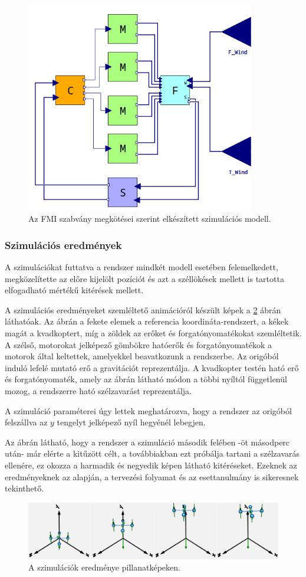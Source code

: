         \begin{figure}[!ht]
            \centering
            \includegraphics[width=100mm, keepaspectratio]{figures/fmiSzim.png}
            \caption{Az FMI szabvány megkötései szerint elkészített szimulációs modell.} 
            \label{fig:fmiSzim}
        \end{figure}

        \subsubsection{Szimulációs eredmények}
        A szimulációkat futtatva a rendszer mindkét modell esetében felemelkedett, megközelítette az előre kijelölt pozíciót és azt a széllökések mellett is tartotta elfogadható mértékű kitérések mellett.
        
        A szimulációs eredményeket szemléltető animációról készült képek a \ref{fig:SimRes} ábrán láthatóak.
        Az ábrán a fekete elemek a referencia koordináta-rendszert, a kékek magát a kvadkoptert, míg a zöldek az erőket és forgatónyomatékokat szemléltetik.
        A szélső, motorokat jelképező gömbökre hatóerők és forgatónyomatékok a motorok által keltettek, amelyekkel beavatkozunk a rendszerbe. Az origóból induló lefelé mutató erő a gravitációt reprezentálja.
        A kvadkopter testén ható erő és forgatónyomaték, amely az ábrán látható módon a többi nyíltól függetlenül mozog, a rendszerre ható szélzavarást reprezentálja.

        A szimuláció paraméterei úgy lettek meghatározva, hogy a rendszer az origóból felszállva az $y$ tengelyt jelképező nyíl hegyénél lebegjen.
        
        Az ábrán látható, hogy a rendszer a szimuláció második felében -öt másodperc után- már elérte a kitűzött célt, a továbbiakban ezt próbálja tartani a szélzavarás ellenére, ez okozza a harmadik és negyedik képen látható kitéréseket.
        Ezeknek az eredményeknek az alapján, a tervezési folyamat és az esettanulmány is sikeresnek tekinthető.

        \begin{figure}[!ht]
            \centering
            \includegraphics[width=150mm, keepaspectratio]{figures/SimRes.png}
            \caption{A szimulációk eredménye pillanatképeken.}
            \label{fig:SimRes}
        \end{figure}
